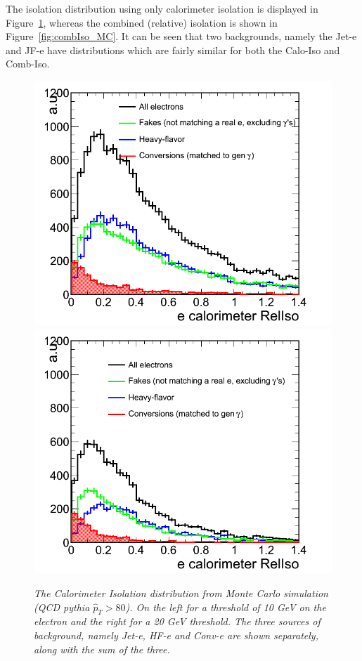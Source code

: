 The isolation distribution using only calorimeter isolation is displayed in Figure~\ref{fig:caloIso_MC}, whereas the combined (relative) isolation is shown in Figure~\ref{fig:combIso_MC}.  It can be seen that two backgrounds, namely the Jet-e and JF-e have distributions which are fairly similar for both the Calo-Iso and Comb-Iso.
\begin{figure}[htb!]
\centering
\includegraphics[scale=0.32]{Plots/caloIso_pt10_MC.png}
\includegraphics[scale=0.32]{Plots/caloIso_pt20_MC.png}
\caption{\textit{The Calorimeter Isolation distribution from Monte Carlo simulation (QCD pythia $\hat{p}_{T} > 80$).  On the left for a threshold of 10 GeV on the electron and the right for a 20 GeV threshold.  The three sources of background, namely Jet-e, HF-e and Conv-e are shown separately, along with the sum of the three.}}\label{fig:caloIso_MC}
\end{figure}

